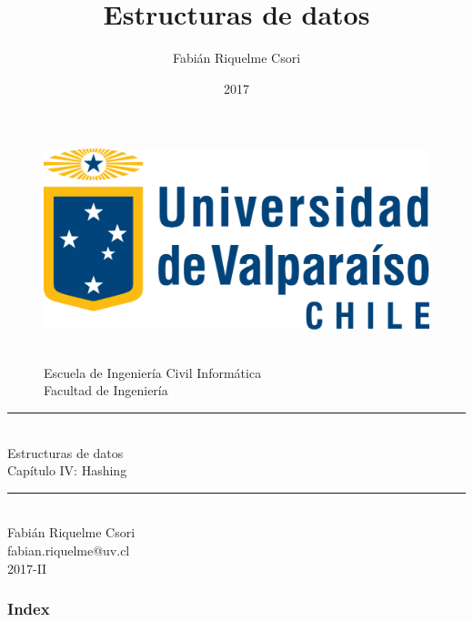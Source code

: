 \documentclass[handout]{beamer} %
\title{Estructuras de datos}   %
\author{Fabián Riquelme Csori} %
\date{2017}                    %
\institute{Universidad de Valparaíso}                 %
\newcommand{\HRule}{\rule{\linewidth}{0.2mm}\\[1ex]}
\begin{document}
%

\begin{frame}[plain]
  \begin{figure}[h]
    \begin{minipage}{0.3\textwidth}
    \includegraphics[width=.9\textwidth]{./image/logo-UV.png}
    \end{minipage}
    \begin{minipage}{0.65\textwidth}
     $~$\\[3.6ex]
     \footnotesize{Escuela de Ingeniería Civil Informática}\\
     \footnotesize{Facultad de Ingeniería}
    \end{minipage}
  \end{figure}
  \begin{center}
    \vspace{1ex}
    \HRule
    \Large{Estructuras de datos}\\{\small Capítulo IV: Hashing}\\[-1ex]
    \HRule\vspace{1ex}
    \large{Fabián Riquelme Csori}\\[.5ex]\footnotesize{fabian.riquelme@uv.cl}\\[6ex] {\tiny 2017-II}\\[6ex]
  \end{center}
\end{frame}

\begin{frame}
 \frametitle{Index}
 \scriptsize 			%
 \tableofcontents		%
\end{frame}
\end{document}
